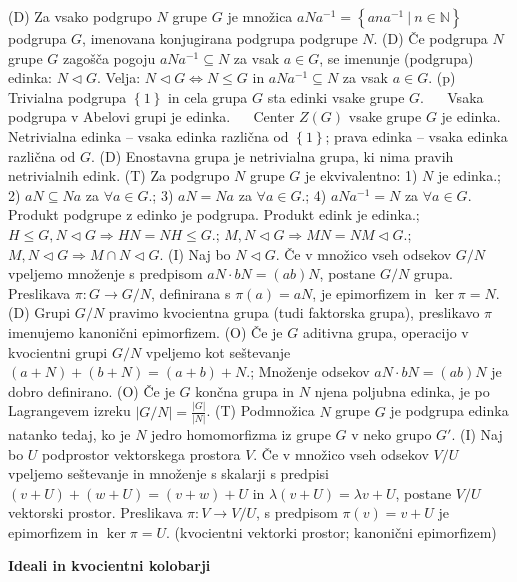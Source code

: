 \documentclass[10pt]{extarticle}
\begin{document}
        
             (D) Za vsako podgrupo $N$ grupe $G$ je množica $aNa^{-1}=\left\{ana^{-1}~|~n\in\mathbb{N}\right\}$ podgrupa $G$, imenovana konjugirana podgrupa podgrupe $N$.
             (D) Če podgrupa $N$ grupe $G$ zagošča pogoju $aNa^{-1}\subseteq N$ za vsak $a\in G$, se imenunje (podgrupa) edinka: $N\triangleleft G$.
             Velja: $N\triangleleft G \Leftrightarrow N\leq G$ in $aNa^{-1}\subseteq N$ za vsak $a\in G$.
             (p) Trivialna podgrupa $\left\{1\right\}$ in cela grupa $G$ sta edinki vsake grupe $G$. ~~ 
             Vsaka podgrupa v Abelovi grupi je edinka. ~~ 
             Center $Z(G)$ vsake grupe $G$ je edinka.            
             Netrivialna edinka -- vsaka edinka različna od $\left\{1\right\}$; prava edinka -- vsaka edinka različna od $G$.
             (D) Enostavna grupa je netrivialna grupa, ki nima pravih netrivialnih edink.
             (T) Za podgrupo $N$ grupe $G$ je ekvivalentno: 1) $N$ je edinka.; 2) $aN\subseteq Na$ za $\forall a\in G$.; 3) $aN=Na$ za $\forall a\in G$.; 4) $aNa^{-1}=N$ za $\forall a\in G$.
             Produkt podgrupe z edinko je podgrupa. Produkt edink je edinka.; $H\leq G, N\triangleleft G \Rightarrow HN=NH\leq G$.; $M,N\triangleleft G \Rightarrow MN=NM\triangleleft G$.; $M,N\triangleleft G \Rightarrow M\cap N\triangleleft G$.
             (I) Naj bo $N\triangleleft G$. Če v množico vseh odsekov $G/N$ vpeljemo množenje s predpisom $aN\cdot bN=(ab)N$, postane $G/N$ grupa. Preslikava $\pi:G\to G/N$, definirana s $\pi(a)=aN$, je epimorfizem in $\ker \pi=N$.
             (D) Grupi $G/N$ pravimo kvocientna grupa (tudi faktorska grupa), preslikavo $\pi$ imenujemo kanonični epimorfizem.
             (O) Če je $G$ aditivna grupa, operacijo v kvocientni grupi $G/N$ vpeljemo kot seštevanje $(a+N)+(b+N)=(a+b)+N$.; Množenje odsekov $aN\cdot bN=(ab)N$ je dobro definirano.
             (O) Če je $G$ končna grupa in $N$ njena poljubna edinka, je po Lagrangevem izreku $|G/N|=\frac{|G|}{|N|}$.
             (T) Podmnožica $N$ grupe $G$ je podgrupa edinka natanko tedaj, ko je $N$ jedro homomorfizma iz grupe $G$ v neko grupo $G'$.
             (I) Naj bo $U$ podprostor vektorskega prostora $V$. Če v množico vseh odsekov $V/U$ vpeljemo seštevanje in množenje s skalarji s predpisi $(v+U)+(w+U)=(v+w)+U$ in $\lambda(v+U)=\lambda v+U$, postane $V/U$ vektorski prostor. Preslikava $\pi: V\to V/U$, s predpisom $\pi(v)=v+U$ je epimorfizem in $\ker\pi=U$. (kvocientni vektorki prostor; kanonični epimorfizem)

    \textbf{Ideali in kvocientni kolobarji}
\end{document}
